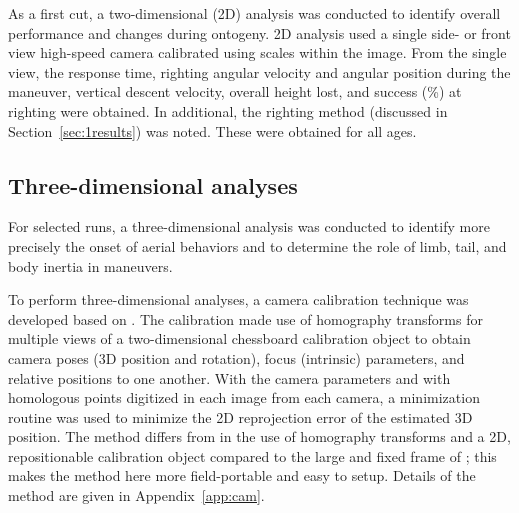As a first cut, a two-dimensional (2D) analysis was conducted to identify overall performance and changes during ontogeny.  2D analysis used a single side- or front view high-speed camera calibrated using scales within the image.  From the single view, 
the response time, righting angular velocity and angular position during the maneuver, vertical descent velocity, overall height lost, and success (\%) at righting were obtained. In additional, the righting method (discussed in Section~\ref{sec:1results}) was noted.  These were obtained for all ages.  

\subsection{Three-dimensional analyses}

For selected runs, a three-dimensional analysis was conducted to identify more precisely the onset of aerial behaviors and to determine the role of limb, tail, and body inertia in maneuvers.  

To perform three-dimensional analyses, a camera calibration technique was developed based on \cite{Munk:2011, Bradski:2008}. The calibration made use of homography transforms for multiple views of a two-dimensional chessboard calibration object to obtain camera poses (3D position and rotation), focus (intrinsic) parameters, and relative positions to one another.  With the camera parameters and with homologous points digitized in each image from each camera, a minimization routine was used to minimize the 2D reprojection error of the estimated 3D position. The method differs from \citep{Munk:2011} in the use of homography transforms and a 2D, repositionable calibration object compared to the large and fixed frame of \citep{Munk:2011}; this makes the method here more field-portable and easy to setup.  Details of the method are given in Appendix~\ref{app:cam}.  

